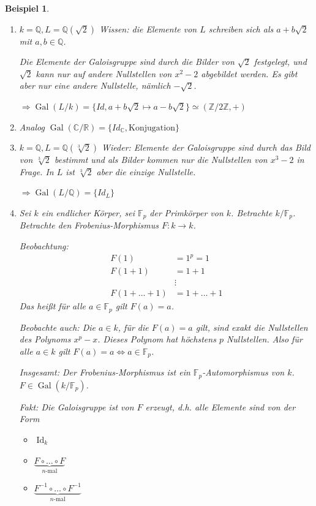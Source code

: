 \documentclass[a4paper,12pt,numbers=noenddot,parskip=full]{scrartcl}
\newcommand{\setZ}{\mathbb{Z}}
\newcommand{\setQ}{\mathbb{Q}}
\newcommand{\setR}{\mathbb{R}}
\newcommand{\setC}{\mathbb{C}}
\DeclareMathOperator{\Gal}{Gal}
\theoremstyle{dotless}
\newtheorem{example}[theorem]{Beispiel}
\theoremstyle{remark}
\begin{document}
	\begin{example}
		\begin{enumerate}
			\item $k = \setQ, L = \setQ(\sqrt{2})$ \textit{Wissen:} die Elemente von $L$ schreiben sich als $a + b \sqrt{2}$ mit $a,b \in \setQ$.
			
			Die Elemente der Galoisgruppe sind durch die Bilder von $\sqrt{2}$ festgelegt, und $\sqrt{2}$ kann nur auf andere Nullstellen von $x^2 - 2$ abgebildet werden. Es gibt aber nur eine andere Nullstelle, nämlich $- \sqrt{2}$.
			
			$\Rightarrow \Gal(L/k) = \{ Id, a + b\sqrt{2} \mapsto a - b\sqrt{2} \} \simeq (\setZ/2\setZ, +)$
			\item Analog $\Gal(\setC/\setR) = \{ Id_\setC, \text{Konjugation} \}$
			
			\item $k = \setQ, L = \setQ(\sqrt[3]{2})$ Wieder: Elemente der Galoisgruppe sind durch das Bild von $\sqrt[3]{2}$ bestimmt und als Bilder kommen nur die Nullstellen von $x^3 - 2$ in Frage. In $L$ ist $\sqrt[3]{2}$ aber die einzige Nullstelle.
			
			$\Rightarrow \Gal(L/\setQ) = \{ Id_L \}$
			
			\item Sei $k$ ein endlicher Körper, sei $\mathbb{F}_p$ der Primkörper von $k$. Betrachte $k/\mathbb{F}_p$. Betrachte den Frobenius-Morphismus $F: k \to k$. 
			
			\textit{Beobachtung:}
			\begin{align*}
				F(1) &= 1^p = 1 \\
				F(1 + 1) &= 1 + 1 \\
				&\vdots \\
				F(1 + \dots + 1) &= 1 + \dots + 1
			\end{align*}
			Das heißt für alle $a \in \mathbb{F}_p$ gilt $F(a) = a$.
			
			\textit{Beobachte auch:} Die $a \in k$, für die $F(a) = a$ gilt, sind exakt die Nullstellen des Polynoms $x^p - x$. Dieses Polynom hat höchstens $p$ Nullstellen. Also für alle $a \in k$ gilt $F(a) = a \Leftrightarrow a \in \mathbb{F}_p$.
			
			\textit{Insgesamt:} Der Frobenius-Morphismus ist ein $\mathbb{F}_p$-Automorphismus von $k$. $F \in \Gal(k/\mathbb{F}_p)$.
			
			\textit{Fakt:} Die Galoisgruppe ist von $F$ erzeugt, d.h. alle Elemente sind von der Form
			\begin{itemize}
				\item $\operatorname{Id}_k$
				\item $\underbrace{F \circ \dots \circ F}_\text{$n$-mal}$
				\item $\underbrace{F^{-1} \circ \dots \circ F^{-1}}_\text{$n$-mal}$
			\end{itemize}
			
		\end{enumerate}
	\end{example}
\end{document}
